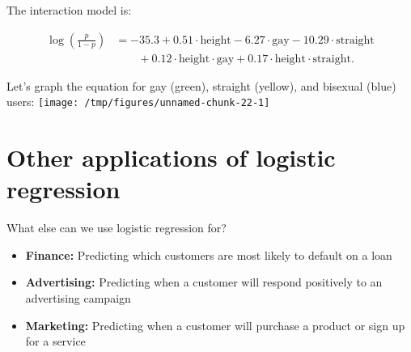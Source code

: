 \documentclass{beamer}\usepackage[]{graphicx}\usepackage[]{color}
\makeatletter
\def\maxwidth{ %
  \ifdim\Gin@nat@width>\linewidth
    \linewidth
  \else
    \Gin@nat@width
  \fi
}
\newenvironment{knitrout}{}{} %
\makeatother
\begin{document}
\begin{darkframes}
    \begin{frame}
      The interaction model is:

      \begin{align*}
        \log\left(\frac{p}{1-p}\right) &=
          -35.3 +
          0.51\cdot\text{height}
          - 6.27\cdot\text{gay}
          - 10.29\cdot\text{straight} \\ & \qquad+
          0.12\cdot\text{height}\cdot\text{gay} +
          0.17\cdot\text{height}\cdot\text{straight}.
      \end{align*}
    \end{frame}

    \begin{frame}
      Let's graph the equation for gay (green), straight (yellow), and bisexual (blue) users:
\begin{knitrout}
\color{fgcolor}
\texttt{[image: /tmp/figures/unnamed-chunk-22-1]} 

\end{knitrout}
    \end{frame}

    \section{Other applications of logistic regression}

    \begin{frame}{What else can we use logistic regression for?}
      \begin{itemize}
        \item \textbf{Finance:} Predicting which customers are most likely to default on a loan
        \item \textbf{Advertising:} Predicting when a customer will respond positively to an advertising campaign
        \item \textbf{Marketing:} Predicting when a customer will purchase a product or sign up for a service
      \end{itemize}
    \end{frame}
  \end{darkframes}
\end{document}
